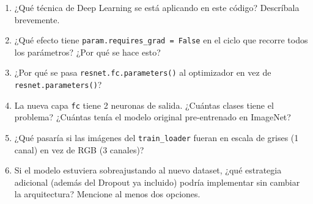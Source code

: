 \documentclass[12pt,a4paper]{article}
\begin{document}
\begin{enumerate}[label=\alph*)]
    \item ¿Qué técnica de Deep Learning se está aplicando en este código? Descríbala brevemente.

    \item ¿Qué efecto tiene \texttt{param.requires\_grad = False} en el ciclo que recorre todos los parámetros? ¿Por qué se hace esto?

    \item ¿Por qué se pasa \texttt{resnet.fc.parameters()} al optimizador en vez de \texttt{resnet.parameters()}?

    \item La nueva capa \texttt{fc} tiene 2 neuronas de salida. ¿Cuántas clases tiene el problema? ¿Cuántas tenía el modelo original pre-entrenado en ImageNet?

    \item ¿Qué pasaría si las imágenes del \texttt{train\_loader} fueran en escala de grises (1 canal) en vez de RGB (3 canales)?

    \item Si el modelo estuviera sobreajustando al nuevo dataset, ¿qué estrategia adicional (además del Dropout ya incluido) podría implementar sin cambiar la arquitectura? Mencione al menos dos opciones.
\end{enumerate}
\end{document}
